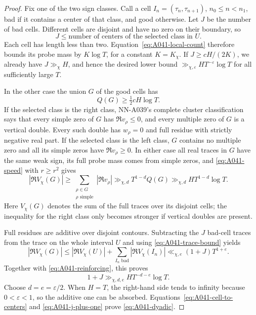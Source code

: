 \begin{proof}
Fix one of the two sign classes. Call a cell
$I_n=(\tau_n,\tau_{n+1})$, $n_0\le n<n_1$, bad if it
contains a center of that class, and good otherwise. Let $J$ be
the number of bad cells. Different cells are disjoint and have
no zero on their boundary, so
\begin{equation}\label{eq:A041-cell-to-centers}
           J\le\text{number of centers of the selected class in }U.
\end{equation}
Each cell has length less than two. Equation~\eqref{eq:A041-local-count}
therefore bounds its probe mass by $K\log T$, for a constant
$K=K_\chi$. If $J\ge cH/(2K)$, we already have
$J\gg_\chi H$, and hence the desired lower bound
$\gg_{\chi,\varepsilon}HT^{-\varepsilon}\log T$ for all
sufficiently large $T$.

In the other case the union $G$ of the good cells has
\begin{equation}\label{eq:A041-good-mass}
                         Q(G)\ge\tfrac12cH\log T.
\end{equation}
If the selected class is the right class, NN-A039's complete
cluster classification says that every simple zero of $G$ has
$\Re v_\rho\le0$, and every multiple zero of $G$ is a
vertical double. Every such double has $w_\rho=0$ and full
residue with strictly negative real part. If the selected class
is the left class, $G$ contains no multiple zero and all its
simple zeros have $\Re v_\rho\ge0$. In either case all real
traces in $G$ have the same weak sign, its full probe mass comes
from simple zeros, and \eqref{eq:A041-speed} with $r\ge r^2$
gives
\begin{equation}\label{eq:A041-reinforcing}
 |\Re V_\chi(G)|
 \ge\sum_{\substack{\rho\in G\\\rho\text{ simple}}}|\Re v_\rho|
 \gg_{\chi,d}T^{1-d} Q(G)
 \gg_{\chi,d}H T^{1-d}\log T.
\end{equation}
Here $V_\chi(G)$ denotes the sum of the full traces over its
disjoint cells; the inequality for the right class only becomes
stronger if vertical doubles are present.

Full residues are additive over disjoint contours. Subtracting
the $J$ bad-cell traces from the trace on the whole interval $U$
and using \eqref{eq:A041-trace-bound} yields
\[
 |\Re V_\chi(G)|
       \le|\Re V_\chi(U)|+
                       \sum_{I_n\text{ bad}}|\Re V_\chi(I_n)|
       \ll_{\chi,e}(1+J)T^{1+e}.
\]
Together with \eqref{eq:A041-reinforcing}, this proves
\begin{equation}\label{eq:A041-j-plus-one}
              1+J\gg_{\chi,d,e}HT^{-d-e}\log T.
\end{equation}
Choose $d=e=\varepsilon/2$. When $H=T$, the right-hand
side tends to infinity because $0<\varepsilon<1$, so the
additive one can be absorbed. Equations~\eqref{eq:A041-cell-to-centers}
and \eqref{eq:A041-j-plus-one} prove \eqref{eq:A041-dyadic}.


\end{proof}
